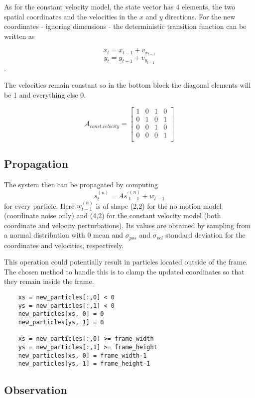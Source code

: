 \documentclass[10pt,a4paper,twoside]{article}
\begin{document}
As for the constant velocity model, the state vector has 4 elements, the two
spatial coordinates and the velocities in the $x$ and $y$
directions. For the new coordinates - ignoring dimensions - the deterministic
transition function can be written as

\[ x_t = x_{t-1} + v_{x_{t-1}} \]
\[ y_t = y_{t-1} + v_{y_{t-1}} \].

The velocities remain constant so in the bottom block the diagonal elements will
be 1 and everything else 0.

\[ A_{const. velocity} =
\begin{bmatrix}
    1 & 0 & 1 & 0 \\
    0 & 1 & 0 & 1 \\ 
    0 & 0 & 1 & 0 \\ 
    0 & 0 & 0 & 1 \\ 
\end{bmatrix}
\]

\subsection{Propagation}

The system then can be propagated by computing
\[
s_t^{(n)} = A{s^{'}}_{t-1}^{(n)} + w_{t-1}
\]
for every particle. Here $w_{t-1}^{(n)}$ is of shape (2,2) for the no motion
model (coordinate noise only) and (4,2) for the constant velocity model (both
coordinate and velocity perturbations). Its values are obtained by sampling from
a normal distribution with 0 mean and $\sigma_{pos}$ and $\sigma_{vel}$
standard deviation for the coordinates and velocities, respectively.

This operation could potentially result in particles located outside of the
frame. The chosen method to handle this is to clamp the updated coordinates so
that they remain inside the frame.

\begin{verbatim}
    xs = new_particles[:,0] < 0
    ys = new_particles[:,1] < 0
    new_particles[xs, 0] = 0
    new_particles[ys, 1] = 0
    
    xs = new_particles[:,0] >= frame_width
    ys = new_particles[:,1] >= frame_height
    new_particles[xs, 0] = frame_width-1
    new_particles[ys, 1] = frame_height-1
\end{verbatim}


\subsection{Observation}
\end{document}
